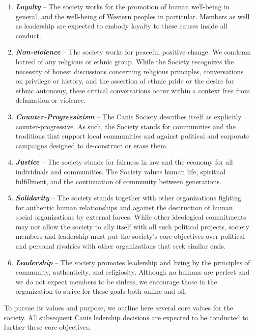 \documentclass[]{article}
\begin{document}
\begin{enumerate}
\item \textbf{\textit{Loyalty}} – The society works for the promotion of human well-being in general, and the well-being of Western peoples in particular. Members as well as leadership are expected to embody loyalty to these causes inside all conduct.
\item \textbf{\textit{Non-violence}} – The society works for peaceful positive change. We condemn  hatred of any religious or ethnic group. While the Society recognizes the necessity of honest discussions concerning religious principles, conversations on privilege or history, and the assertion of ethnic pride or the desire for ethnic autonomy, these critical conversations occur within a context free from defamation or violence.
\item \textbf{\textit{Counter-Progressivism}} – The Canis Society describes itself as explicitly counter-progressive. As such, the Society stands for communities and the traditions that support local communities and against political and corporate campaigns designed to de-construct or erase them.
\item \textbf{\textit{Justice}} – The society stands for fairness in law and the economy for all individuals and communities. The Society values human life, spiritual fulfillment, and the continuation of community between generations.
\item \textbf{\textit{Solidarity}} – The society stands together with other organizations fighting for authentic human relationships and against the destruction of human social organizations by external forces. While other ideological commitments may not allow the society to ally itself with all such political projects, society members and leadership must put the society's core objectives over political and personal rivalries with other organizations that seek similar ends.
\item \textbf{\textit{Leadership}} – The society promotes leadership and living by the principles of community, authenticity, and religiosity. Although no humans are perfect and we do not expect members to be sinless, we encourage those in the organization to strive for these goals both online and off.
\end{enumerate}


\vspace{2mm}
\noindent 
To pursue its values and purpose, we outline here several core values for the society. All subsequent Canis ledership decisions are expected to be conducted to further these core objectives.
\end{document}
